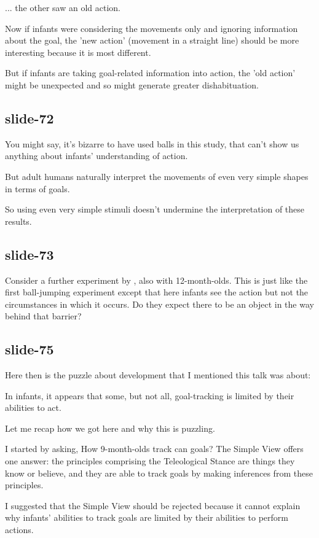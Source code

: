 \documentclass[12pt,\papersize]{extarticle}
\begin{document}
... the other saw an old action.
 
Now if infants were considering the movements only and ignoring information about the goal, the 'new action' (movement in a straight line) should be more interesting because it is most different.
 
But if infants are taking goal-related information into action, the 'old action' might be unexpected and so might generate greater dishabituation.
 
\subsection{slide-72}
You might say, it's bizarre to have used balls in this study, that can't show us anything about infants' understanding of action.
 
But adult humans naturally interpret the movements of even very simple shapes in terms of goals.
 
So using even very simple stimuli doesn't undermine the interpretation of these results.
 
\subsection{slide-73}
Consider a further experiment by \citet{Csibra:2003jv}, also with
12-month-olds. This is just like the first ball-jumping experiment
except that here infants see the action but not the circumstances in
which it occurs. Do they expect there to be an object in the way behind
that barrier?
 
\subsection{slide-75}
Here then is the puzzle about development that I mentioned this talk was about:
 
In infants, 
it appears that 
some, 
but not all, 
goal-tracking is limited by their abilities to act.
 
Let me recap how we got here and why this is puzzling.
 
I started by asking, How 9-month-olds track can goals?
The Simple View offers one answer: 
the principles comprising the Teleological Stance are things they know or believe, and they are able
to track goals by making inferences from these principles.
 
I suggested that the Simple View should be rejected because it cannot explain why infants’
abilities to track goals are limited by their abilities to perform actions.
 
\end{document}
